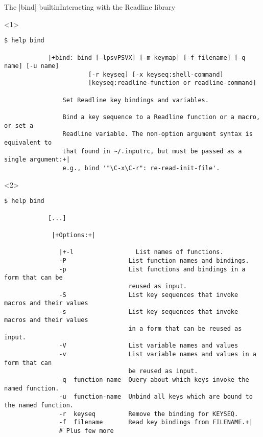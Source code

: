 \begin{frame}[fragile]{The \bash|bind| builtin}{Interacting with the Readline library}
    \begin{onlyenv}<1>
        \begin{lstlisting}[style=myBash, style=smaller, numbers=none]
            $ help bind

            |+bind: bind [-lpsvPSVX] [-m keymap] [-f filename] [-q name] [-u name]
                       [-r keyseq] [-x keyseq:shell-command]
                       [keyseq:readline-function or readline-command]

                Set Readline key bindings and variables.

                Bind a key sequence to a Readline function or a macro, or set a
                Readline variable. The non-option argument syntax is equivalent to
                that found in ~/.inputrc, but must be passed as a single argument:+|
                e.g., bind '"\C-x\C-r": re-read-init-file'.
        \end{lstlisting}
    \end{onlyenv}
    \begin{onlyenv}<2>
        \begin{lstlisting}[style=myBash, style=smaller, numbers=none]
            $ help bind

            [...]

             |+Options:+|

               |+-l                 List names of functions.
               -P                 List function names and bindings.
               -p                 List functions and bindings in a form that can be
                                  reused as input.
               -S                 List key sequences that invoke macros and their values
               -s                 List key sequences that invoke macros and their values
                                  in a form that can be reused as input.
               -V                 List variable names and values
               -v                 List variable names and values in a form that can
                                  be reused as input.
               -q  function-name  Query about which keys invoke the named function.
               -u  function-name  Unbind all keys which are bound to the named function.
               -r  keyseq         Remove the binding for KEYSEQ.
               -f  filename       Read key bindings from FILENAME.+|
               # Plus few more
        \end{lstlisting}
    \end{onlyenv}
\end{frame}
